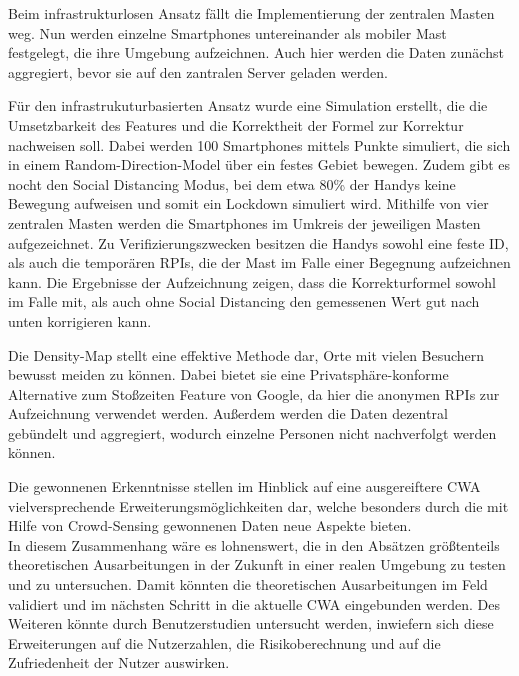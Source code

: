 \documentclass[conference,compsoc]{IEEEtran}
\begin{document}
Beim infrastrukturlosen Ansatz fällt die Implementierung der zentralen Masten weg. 
Nun werden einzelne Smartphones untereinander als mobiler Mast festgelegt, die ihre Umgebung aufzeichnen.
Auch hier werden die Daten zunächst aggregiert, bevor sie auf den zantralen Server geladen werden.

Für den infrastrukuturbasierten Ansatz wurde eine Simulation erstellt, die die Umsetzbarkeit des Features und die Korrektheit der Formel zur Korrektur nachweisen soll. 
Dabei werden 100 Smartphones mittels Punkte simuliert, die sich in einem Random-Direction-Model über ein festes Gebiet bewegen. 
Zudem gibt es nocht den \glqq Social Distancing \grqq{} Modus, bei dem etwa 80\% der Handys keine Bewegung aufweisen und somit ein Lockdown simuliert wird.
Mithilfe von vier zentralen Masten werden die Smartphones im Umkreis der jeweiligen Masten aufgezeichnet. 
Zu Verifizierungszwecken besitzen die Handys sowohl eine feste ID, als auch die temporären RPIs, die der Mast im Falle einer Begegnung aufzeichnen kann. 
Die Ergebnisse der Aufzeichnung zeigen, dass die Korrekturformel sowohl im Falle mit, als auch ohne Social Distancing den gemessenen Wert gut nach unten korrigieren kann. 

Die Density-Map stellt eine effektive Methode dar, Orte mit vielen Besuchern bewusst meiden zu können.
Dabei bietet sie eine Privatsphäre-konforme Alternative zum Stoßzeiten Feature von Google, da hier die anonymen RPIs zur Aufzeichnung verwendet werden. 
Außerdem werden die Daten dezentral gebündelt und aggregiert, wodurch einzelne Personen nicht nachverfolgt werden können. 

Die gewonnenen Erkenntnisse stellen im Hinblick auf eine ausgereiftere CWA vielversprechende Erweiterungsmöglichkeiten dar, welche besonders durch die mit Hilfe von Crowd-Sensing gewonnenen Daten neue Aspekte bieten.\\
In diesem Zusammenhang wäre es lohnenswert, die in den Absätzen größtenteils theoretischen Ausarbeitungen in der Zukunft in einer realen Umgebung zu testen und zu untersuchen. 
Damit könnten die theoretischen Ausarbeitungen im Feld validiert und im nächsten Schritt in die aktuelle CWA eingebunden werden.
Des Weiteren könnte durch Benutzerstudien untersucht werden, inwiefern sich diese Erweiterungen auf die Nutzerzahlen, die Risikoberechnung und auf die Zufriedenheit der Nutzer auswirken. 
\end{document}
